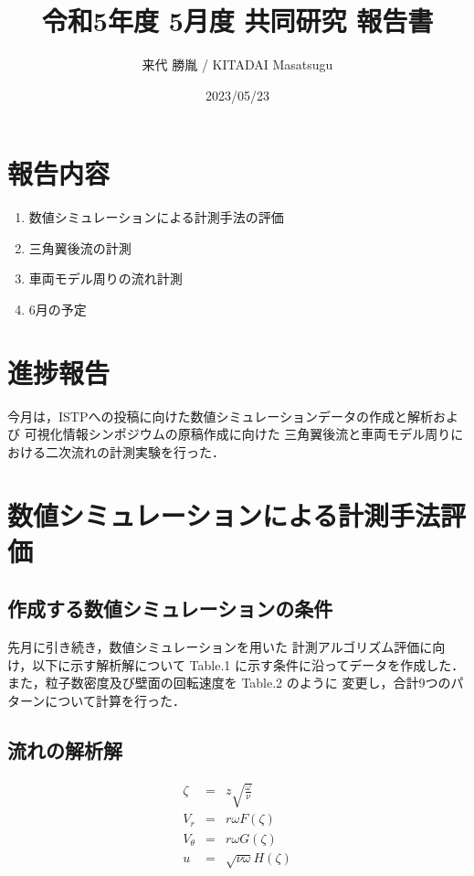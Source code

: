 \documentclass[twocolumn,a4j]{jsarticle}
\author{来代 勝胤 / KITADAI Masatsugu}
\title{令和5年度 5月度 共同研究 報告書}
\date{2023/05/23}
\begin{document}
\columnseprule=0.1mm
\maketitle

\section*{報告内容}
\begin{enumerate}[1.]
  \item 数値シミュレーションによる計測手法の評価
  \item 三角翼後流の計測
  \item 車両モデル周りの流れ計測
  \item 6月の予定
\end{enumerate}

\section*{進捗報告}
今月は，ISTPへの投稿に向けた数値シミュレーションデータの作成と解析および
可視化情報シンポジウムの原稿作成に向けた
三角翼後流と車両モデル周りにおける二次流れの計測実験を行った．

\section{数値シミュレーションによる計測手法評価}
\subsection{作成する数値シミュレーションの条件}
先月に引き続き，数値シミュレーションを用いた
計測アルゴリズム評価に向け，以下に示す解析解について
Table.1 に示す条件に沿ってデータを作成した．
また，粒子数密度及び壁面の回転速度を Table.2 のように
変更し，合計9つのパターンについて計算を行った．\\

\subsection*{流れの解析解}
\begin{eqnarray*}
  \zeta &=& z \sqrt{\frac{\omega}{\nu}}\\
  V_r &=& r \omega F \left(\zeta\right)\\
  V_\theta &=& r \omega G \left(\zeta\right)\\
  u &=& \sqrt{\nu \omega} H \left(\zeta\right)
\end{eqnarray*}
\end{document}
